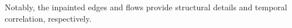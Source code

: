 Notably, the inpainted edges and flows provide structural details and temporal correlation, respectively. 



















